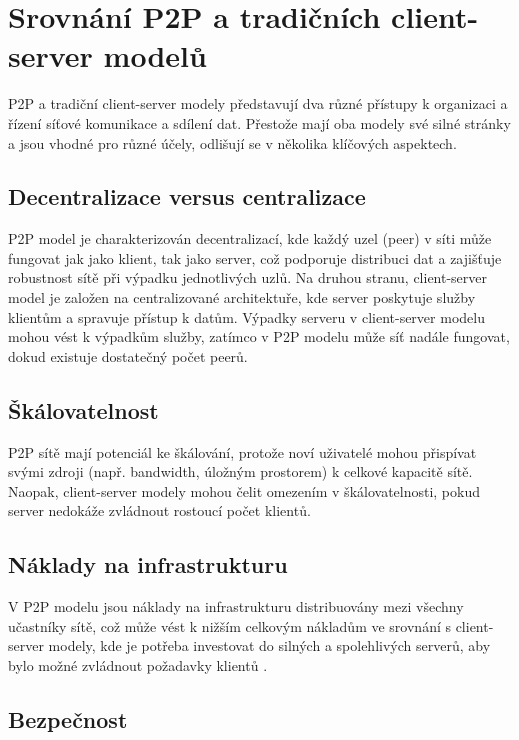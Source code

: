 \documentclass[10pt,twoside,czech,a4paper]{article}
\begin{document}
\section{Srovnání P2P a tradičních client-server modelů}

P2P a tradiční client-server modely představují dva různé přístupy k organizaci a řízení síťové komunikace a sdílení dat.
Přestože mají oba modely své silné stránky a jsou vhodné pro různé účely, odlišují se v několika klíčových aspektech.

\subsection{Decentralizace versus centralizace}

P2P model je charakterizován decentralizací, kde každý uzel (peer) v síti může fungovat jak jako klient, tak jako server, což podporuje distribuci dat a zajišťuje robustnost sítě při výpadku jednotlivých uzlů.
Na druhou stranu, client-server model je založen na centralizované architektuře, kde server poskytuje služby klientům a spravuje přístup k datům.
Výpadky serveru v client-server modelu mohou vést k výpadkům služby, zatímco v P2P modelu může síť nadále fungovat, dokud existuje dostatečný počet peerů.

\subsection{Škálovatelnost}

P2P sítě mají potenciál ke škálování, protože noví uživatelé mohou přispívat svými zdroji (např. bandwidth, úložným prostorem) k celkové kapacitě sítě.
Naopak, client-server modely mohou čelit omezením v škálovatelnosti, pokud server nedokáže zvládnout rostoucí počet klientů.

\subsection{Náklady na infrastrukturu}

V P2P modelu jsou náklady na infrastrukturu distribuovány mezi všechny učastníky sítě, což může vést k nižším celkovým nákladům ve srovnání s client-server modely, kde je potřeba investovat do silných a spolehlivých serverů, aby bylo možné zvládnout požadavky klientů \cite{Leibnitz2007}.

\subsection{Bezpečnost}
\end{document}

